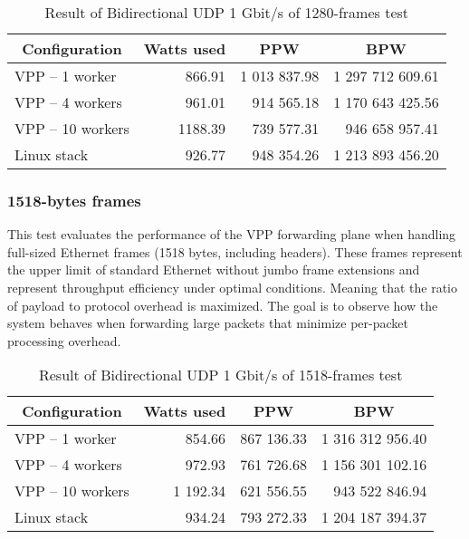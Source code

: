 \begin{table}[h!]
\centering
\begin{tabular}{|l|r|r|r|}
\hline
\multicolumn{1}{|c|}{\textbf{Configuration}} &
\multicolumn{1}{c|}{\textbf{Watts used}} &
\multicolumn{1}{c|}{\textbf{PPW}} &
\multicolumn{1}{c|}{\textbf{BPW}} \\
\hline
VPP -- 1 worker & 866.91 & 1 013 837.98 & 1 297 712 609.61 \\
VPP -- 4 workers & 961.01 & 914 565.18 & 1 170 643 425.56 \\
VPP -- 10 workers & 1188.39 & 739 577.31 & 946 658 957.41 \\
Linux stack & 926.77 & 948 354.26 & 1 213 893 456.20 \\
\hline
\end{tabular}
\caption{Result of Bidirectional UDP 1 Gbit/s of 1280-frames test}
\label{tab:udp:five}
\end{table}



\subsubsection{1518-bytes frames}
This test evaluates the performance of the VPP forwarding plane when handling full-sized Ethernet frames (1518 bytes, including headers). 
These frames represent the upper limit of standard Ethernet without jumbo frame extensions and represent throughput efficiency under optimal conditions. 
Meaning that the ratio of payload to protocol overhead is maximized. The goal is to observe how the system behaves when forwarding large packets that minimize per-packet processing overhead.

\begin{table}[h!]
\centering
\begin{tabular}{|l|r|r|r|}
\hline
\multicolumn{1}{|c|}{\textbf{Configuration}} &
\multicolumn{1}{c|}{\textbf{Watts used}} &
\multicolumn{1}{c|}{\textbf{PPW}} &
\multicolumn{1}{c|}{\textbf{BPW}} \\
\hline
VPP -- 1 worker & 854.66 & 867 136.33 & 1 316 312 956.40 \\
VPP -- 4 workers & 972.93 & 761 726.68 & 1 156 301 102.16 \\
VPP -- 10 workers & 1 192.34 & 621 556.55 & 943 522 846.94 \\
Linux stack & 934.24 & 793 272.33 & 1 204 187 394.37 \\
\hline
\end{tabular}
\caption{Result of Bidirectional UDP 1 Gbit/s of 1518-frames test}
\label{tab:udp:five}
\end{table}

